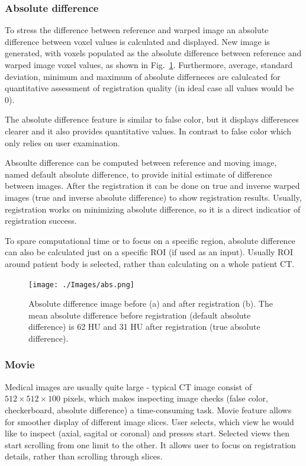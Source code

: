 \documentclass[type=dr, dr=rernat, accentcolor=tud7b,colorbacktitle, bigchapter, openright, twoside, 12pt ]{tudthesis}
\begin{document}
\subsubsection{Absolute difference} 

To stress the difference between reference and warped image an absolute difference between voxel values is calculated and displayed. New image is generated, with voxels populated as the absolute difference between reference and warped image voxel values, as shown in Fig.~\ref{absDiff}. Furthermore, average, standard deviation, minimum and maximum of absolute differneces are calulcated for quantitative assessment of registration quality (in ideal case all values would be 0).

The absolute difference feature is similar to false color, but it displays differences clearer and it also provides quantitative values. In contrast to false color which only relies on user examination. 

Absoulte difference can be computed between reference and moving image, named default absolute difference, to provide initial estimate of difference between images. After the registration it can be done on
true and inverse warped images (true and inverse absolute difference) to show registration results. Usually, registration works on minimizing absolute difference, so it is a direct indicatior
of registration success.

To spare computational time or to focus on a specific region, absolute difference can also be calculated just on a specific ROI (if used as an input). Usually ROI around patient body is selected, rather than calculating on a whole patient CT.


\begin{figure}[H]
	\begin{center}		
		\texttt{[image: ./Images/abs.png]}
		\caption{Absolute difference image before (a) and after registration (b). The mean absolute difference before registration (default absolute difference) is 62 HU and 31 HU after registration (true absolute difference).}
		\label{absDiff}
	\end{center}
\end{figure}

\subsubsection{Movie}

Medical images are usually quite large - typical CT image consist of $512 \times 512 \times 100$ pixels, which makes inspecting image checks (false color, checkerboard, absolute difference) a time-consuming task. Movie feature allows for smoother display of different image slices. User selects, which view he would like to inspect (axial, sagital or coronal) and presses start. Selected views then start scrolling from one limit to the other. It allows user to focus on registration details, rather than scrolling through slices.
\end{document}
